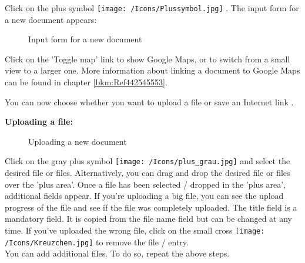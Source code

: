Click on the plus symbol \texttt{[image: /Icons/Plussymbol.jpg]} . The input form for a new document appears:

\begin{figure}[H]
\caption{Input form for a new document}
\end{figure}

Click on the 'Toggle map' link  to show Google Maps, or to switch from a small view to a larger one. More information about linking a document to Google Maps can be found in chapter \ref{bkm:Ref442545553}. \newline

You can now choose whether you want to upload a file  or save an Internet link .

\vspace{\baselineskip}

\textbf{Uploading a file:} 
\begin{figure}[H]
\caption{Uploading a new document}
\end{figure}

Click on the gray plus symbol \texttt{[image: /Icons/plus\_grau.jpg]}  and select the desired file or files. Alternatively, you can drag and drop the desired file or files over the 'plus area'. Once a file has been selected / dropped in the 'plus area', additional fields  appear. If you're uploading a big file, you can see the upload progress of the file  and see if the file was completely uploaded. The title field is a mandatory field. It is copied from the file name field  but can be changed at any time. If you've uploaded the wrong file, click on the small cross \texttt{[image: /Icons/Kreuzchen.jpg]}  to remove the file / entry. \\
You can add additional files. To do so, repeat the above steps. 

